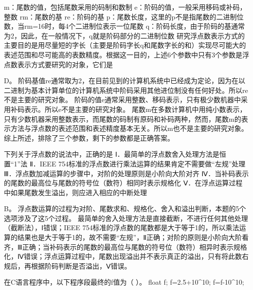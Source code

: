 m：尾数的值，包括尾数采用的码制和数制
e：阶码的值，一般采用移码或补码，整数 rm：尾数的基 re：阶码的基
p：尾数长度，这里的p不是指尾数的二进制位数，当rm=16时，每4个二进制位表示一位尾数
q：阶码长度，由于阶码的基通常为2，因此，在一般情况下，q就是阶码部分的二进制位数
研究浮点数表示方式的主要目的是用尽量短的字长（主要是阶码字长q和尾数字长的和）实现尽可能大的表述范围和尽可能高的表数精度。根据这一目的，上述6个参数中只有3个参数是浮点数表示方式要研究的对象，它们是
\par{}
\begin{solution}D。
阶码基值re通常取为2，在目前见到的计算机系统中已经成为定论，因为在以二进制为基本计算单位的计算机系统中阶码采用其他进位制没有任何好处。所以re不是主要的研究对象。
阶码的值e通常采用整数、移码表示，只有极少数机器中采用补码表示。所以e不是主要的研究对象。
尾数m在多数计算机中用纯小数表示，只有少数机器采用整数表示，而尾数的码制有原码和补码两种，然而，尾数m的表示方法与浮点数的表述范围和表述精度基本无关。所以m也不是主要的研究对象。
综上所述，排除了三个参数，剩下的参数都是正确答案。
\end{solution}
\question 下列关于浮点数的说法中，正确的是
Ⅰ．最简单的浮点数舍入处理方法是恒置``1''法 Ⅱ．IEEE
754标准的浮点数进行乘法运算的结果肯定不需要做``左规''处理
Ⅲ．浮点数加减运算的步骤中，对阶的处理原则是小阶向大阶对齐
Ⅳ．当补码表示的尾数的最高位与尾数的符号位（数符）相同时表示规格化
Ⅴ．在浮点运算过程中如果尾数发生溢出，则应进入相应的中断处理
\par{}
\begin{solution}B。
浮点数运算的过程为对阶、尾数求和、规格化、舍入和溢出判断，本题的5个选项涉及了这5个过程。
最简单的舍入处理方法是直接截断，不进行任何其他处理（截断法），Ⅰ错误；IEEE
754标准的浮点数的尾数都是大于等于1的，所以乘法运算的结果也是大于等于1的，故不需要``左规''，Ⅱ正确；对阶的原则是小阶向大阶看齐，Ⅲ正确；当补码表示的尾数的最高位与尾数的符号位（数符）相异时表示规格化，Ⅳ错误；浮点运算过程中，尾数出现溢出并不表示真正的溢出，只有将此数右规后，再根据阶码判断是否溢出，Ⅴ错误。
\end{solution}
\question 在C语言程序中，以下程序段最终的f值为（ ）。 float f; f=2.5+10\^{}10;
f=f-10\^{}10;
\par{}
